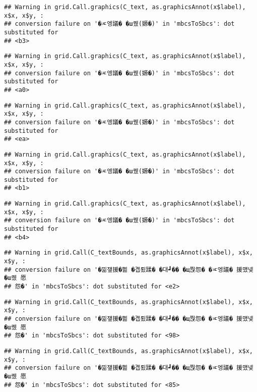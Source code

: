 \documentclass[
]{article}
\begin{document}
\begin{verbatim}
## Warning in grid.Call.graphics(C_text, as.graphicsAnnot(x$label), x$x, x$y, :
## conversion failure on '�ㅼ엥議� �ш퀬(嫄�)' in 'mbcsToSbcs': dot substituted for
## <b3>
\end{verbatim}

\begin{verbatim}
## Warning in grid.Call.graphics(C_text, as.graphicsAnnot(x$label), x$x, x$y, :
## conversion failure on '�ㅼ엥議� �ш퀬(嫄�)' in 'mbcsToSbcs': dot substituted for
## <a0>
\end{verbatim}

\begin{verbatim}
## Warning in grid.Call.graphics(C_text, as.graphicsAnnot(x$label), x$x, x$y, :
## conversion failure on '�ㅼ엥議� �ш퀬(嫄�)' in 'mbcsToSbcs': dot substituted for
## <ea>
\end{verbatim}

\begin{verbatim}
## Warning in grid.Call.graphics(C_text, as.graphicsAnnot(x$label), x$x, x$y, :
## conversion failure on '�ㅼ엥議� �ш퀬(嫄�)' in 'mbcsToSbcs': dot substituted for
## <b1>
\end{verbatim}

\begin{verbatim}
## Warning in grid.Call.graphics(C_text, as.graphicsAnnot(x$label), x$x, x$y, :
## conversion failure on '�ㅼ엥議� �ш퀬(嫄�)' in 'mbcsToSbcs': dot substituted for
## <b4>
\end{verbatim}

\begin{verbatim}
## Warning in grid.Call(C_textBounds, as.graphicsAnnot(x$label), x$x, x$y, :
## conversion failure on '�낆쟾援�쁾 �곕룄蹂� �대┛�� �щ쭩怨� �ㅼ엥議� 援먰넻�ш퀬 愿
## 怨�' in 'mbcsToSbcs': dot substituted for <e2>
\end{verbatim}

\begin{verbatim}
## Warning in grid.Call(C_textBounds, as.graphicsAnnot(x$label), x$x, x$y, :
## conversion failure on '�낆쟾援�쁾 �곕룄蹂� �대┛�� �щ쭩怨� �ㅼ엥議� 援먰넻�ш퀬 愿
## 怨�' in 'mbcsToSbcs': dot substituted for <98>
\end{verbatim}

\begin{verbatim}
## Warning in grid.Call(C_textBounds, as.graphicsAnnot(x$label), x$x, x$y, :
## conversion failure on '�낆쟾援�쁾 �곕룄蹂� �대┛�� �щ쭩怨� �ㅼ엥議� 援먰넻�ш퀬 愿
## 怨�' in 'mbcsToSbcs': dot substituted for <85>
\end{verbatim}
\end{document}
